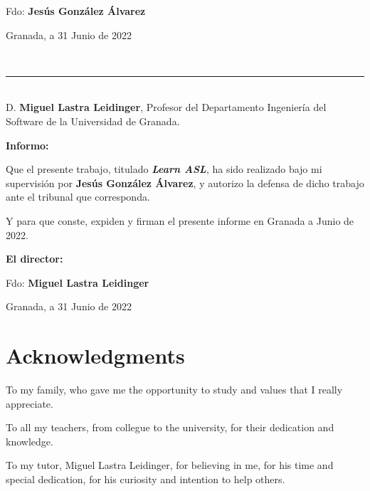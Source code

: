 \vspace{7.5cm}

\noindent Fdo: \textbf{Jesús González Álvarez}

\vspace{2cm}

\begin{flushright}
Granada, a 31 Junio de 2022
\end{flushright}

\newpage
\thispagestyle{empty}
\
\vspace{3cm}

\noindent\rule[-1ex]{\textwidth}{2pt}\\[4.5ex]

D. \textbf{Miguel Lastra Leidinger}, Profesor del Departamento Ingeniería del Software de la Universidad de Granada.


\vspace{0.5cm}

\textbf{Informo:}

\vspace{0.5cm}

Que el presente trabajo, titulado \textit{\textbf{Learn ASL}},
ha sido realizado bajo mi supervisión por \textbf{Jesús González Álvarez}, y autorizo la defensa de dicho trabajo ante el tribunal
que corresponda.

\vspace{0.5cm}

Y para que conste, expiden y firman el presente informe en Granada a Junio de 2022.

\vspace{1cm}

\textbf{El director: }

\vspace{4cm}

\noindent Fdo: \textbf{Miguel Lastra Leidinger}

\vspace{2cm}

\begin{flushright}
Granada, a 31 Junio de 2022
\end{flushright}

\chapter*{Acknowledgments}
\thispagestyle{empty}

\vspace{1cm}

\noindent To my family, who gave me the opportunity to study and values that I really appreciate.

\bigskip
\noindent To all my teachers, from collegue to the university, for their dedication and knowledge.

\bigskip
\noindent To my tutor, Miguel Lastra Leidinger, for believing in me, for his time and special dedication, for his curiosity and intention to help others.






